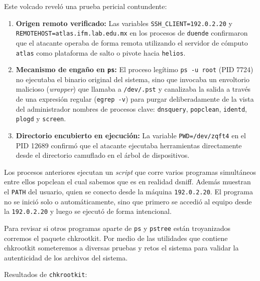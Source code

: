 Este volcado reveló una prueba pericial contundente:
\begin{enumerate}
    \item \textbf{Origen remoto verificado:} Las variables \texttt{SSH\_CLIENT=192.0.2.20} y \texttt{REMOTEHOST=}\allowbreak\nolinkurl{atlas.ifm.lab.edu.mx} en los procesos de \texttt{duende} confirmaron que el atacante operaba de forma remota utilizando el servidor de cómputo \texttt{atlas} como plataforma de salto o pivote hacia \texttt{helios}.
    \item \textbf{Mecanismo de engaño en \texttt{ps}:} El proceso legítimo \texttt{ps -u root} (PID 7724) no ejecutaba el binario original del sistema, sino que invocaba un envoltorio malicioso (\textit{wrapper}) que llamaba a \texttt{/dev/.pst} y canalizaba la salida a través de una expresión regular (\texttt{egrep -v}) para purgar deliberadamente de la vista del administrador nombres de procesos clave: \texttt{dnsquery}, \texttt{popclean}, \texttt{identd}, \texttt{plogd} y \texttt{screen}.
    \item \textbf{Directorio encubierto en ejecución:} La variable \texttt{PWD=/dev/zqft4} en el PID 12689 confirmó que el atacante ejecutaba herramientas directamente desde el directorio camuflado en el árbol de dispositivos.
\end{enumerate}

\vspace{1em}

 Los procesos anteriores ejecutan un \textit{script} que corre varios programas
simultáneos entre ellos popclean el cual sabemos que es en realidad
dsniff. Además muestran el \texttt{PATH} del usuario, quien se conecto desde la
máquina \texttt{192.0.2.20}. El programa no se inició solo o automáticamente, sino que primero se
accedió al equipo desde la \texttt{192.0.2.20} y luego se ejecutó de forma intencional.


 Para revisar si otros programas aparte de \texttt{ps} y \texttt{pstree} están
troyanizados corremos el paquete chkrootkit. Por medio de las
utilidades que contiene chkrootkit someteremos a diversas pruebas y
retos el sistema para validar la autenticidad de los archivos del
sistema.


 Resultados de \texttt{chkrootkit}:
 
\vspace{1em}

